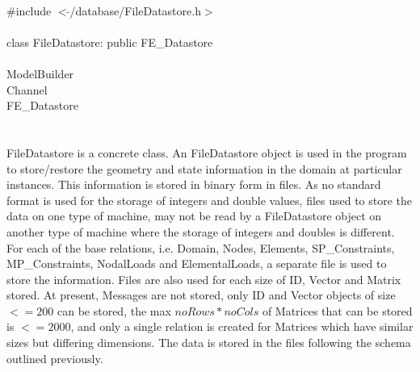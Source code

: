 
   \\
\indent \#include $<\tilde{ }$/database/FileDatastore.h$>$  \\

  \\
\indent class FileDatastore: public FE\_Datastore \\

 \\
\indent ModelBuilder \\
\indent Channel \\
\indent\indent FE\_Datastore \\
\indent\indent{} \\

  \\
\indent FileDatastore is a concrete class. An FileDatastore object is
used in the program to store/restore the geometry and state information 
in the domain at particular instances. This information is stored in
binary form in files. As no standard format is used for the storage of
integers and double values, files used to store the data on one type
of machine, may not be read by a FileDatastore object on another type
of machine where the storage of integers and doubles is different. \\

For each of the base relations, i.e. Domain, Nodes, Elements,
SP\_Constraints, MP\_Constraints, NodalLoads and ElementalLoads, a
separate file is used to store the information. Files are also used
for each size of ID, Vector and Matrix stored. At present, Messages
are not stored, only ID and Vector objects of size $<= 200$ can be
stored, the max $noRows * noCols$ of Matrices that can be stored
is $<= 2000$, and only a single relation is created for Matrices which
have similar sizes but differing dimensions. The data is stored in the
files following the schema outlined previously.\\


